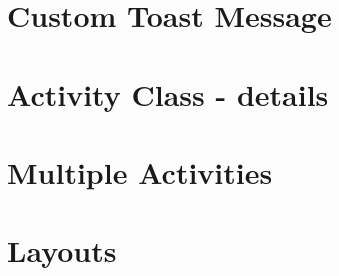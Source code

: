 \documentclass[11pt]{beamer}
\begin{document}
\section{Custom Toast Message}

\section{Activity Class - details}

\section{Multiple Activities}

\section{Layouts}





\end{document}
